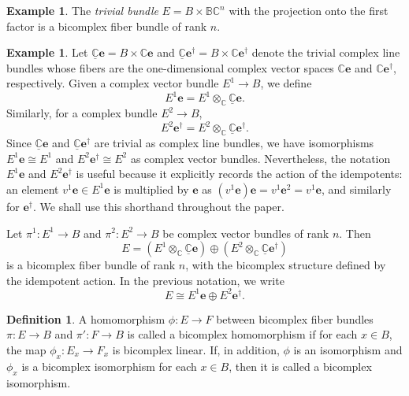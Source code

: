\documentclass[11pt]{amsart}
\newcommand{\BC}{\mathbb{BC}}       %
\newcommand{\e}{\mathbf{e}}          %
\newcommand{\ed}{\mathbf{e}^\dagger} %
\theoremstyle{definition}
\newtheorem{defn}[prop]{Definition}       %
\newtheorem{example}[prop]{Example}       %
\begin{document}
\begin{example}
    The \emph{trivial bundle} $E = B \times \BC^n$ with the projection onto the first factor is a bicomplex fiber bundle of rank $n$.
\end{example}

\begin{example}\label{ex: universal}
Let $\underline{\mathbb C}\e = B \times \mathbb C\e$ and $\underline{\mathbb C}\ed = B \times \mathbb C\ed$ denote the trivial complex line bundles whose fibers are the one-dimensional complex vector spaces $\mathbb C\e$ and $\mathbb C\ed$, respectively. Given a complex vector bundle $E^1 \to B$, we define
\begin{equation*}
    E^1 \e = E^1 \otimes_{\mathbb C} \underline{\mathbb C}\e.
\end{equation*}
Similarly, for a complex bundle \(E^2 \to B\),
\begin{equation*}
    E^2 \ed = E^2 \otimes_{\mathbb C} \underline{\mathbb C}\ed.
\end{equation*}
Since $\underline{\mathbb C}\e$ and $\underline{\mathbb C}\ed$ are trivial as complex line bundles, we have isomorphisms $E^1\e \cong E^1$ and $E^2\ed \cong E^2$ as complex vector bundles. Nevertheless, the notation $E^1\e$ and $E^2\ed$ is useful because it explicitly records the action of the idempotents: an element $v^1\e \in E^1\e$ is multiplied by \(\e\) as $(v^1\e)\e = v^1\e^2 = v^1\e$, and similarly for \(\ed\). We shall use this shorthand throughout the paper.

Let $\pi^1:E^1 \to B$ and $\pi^2:E^2 \to B$ be complex vector bundles of rank $n$. Then
\begin{equation*}
    E = (E^1 \otimes_{\mathbb C} \underline{\mathbb C}\e) \oplus (E^2 \otimes_{\mathbb C} \underline{\mathbb C}\ed)
\end{equation*}
is a bicomplex fiber bundle of rank $n$, with the bicomplex structure defined by the idempotent action. In the previous notation, we write
\begin{equation*}
    E \cong E^1\e \oplus E^2\ed.
\end{equation*}    
\end{example}


\begin{defn}\label{def:isomorphism}
    A homomorphism $\phi : E \to F$ between bicomplex fiber bundles $\pi : E \to B$ and $\pi' : F \to B$ is called a bicomplex homomorphism if for each $x \in B$, the map $\phi_{x} : E_{x} \to F_{x}$ is bicomplex linear. If, in addition, $\phi$ is an isomorphism and $\phi_{x}$ is a bicomplex isomorphism for each $x \in B$, then it is called a bicomplex isomorphism. 
\end{defn}
\end{document}
